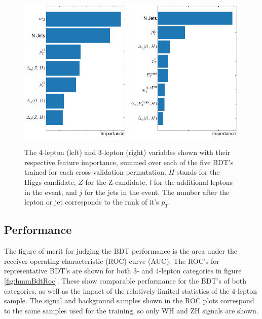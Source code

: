 \begin{figure}[htpb]
  \centering
  \includegraphics[height=7cm]{figures/hmm/bdtImportance/imp-4lep.pdf}
  \includegraphics[height=7cm]{figures/hmm/bdtImportance/imp-3lep.pdf}
  \caption{The 4-lepton (left) and 3-lepton (right) variables shown with their respective feature importance, summed over each of the five BDT's trained for each cross-validation permutation. $H$ stands for the Higgs candidate, $Z$ for the Z candidate, $l$ for the additional leptons in the event, and $j$ for the jets in the event. The number after the lepton or jet corresponds to the rank of it's $p_T$.}
    \label{fig:hmmVarImport}
\end{figure}

\clearpage

\subsection{Performance}
\label{sec:hmmBdtPerform}

The figure of merit for judging the BDT performance is the area under the receiver operating characteristic (ROC) curve (AUC). The ROC's for representative BDT's are shown for both 3- and 4-lepton categories in figure \ref{fig:hmmBdtRoc}. These show comparable performance for the BDT's of both categories, as well as the impact of the relatively limited statistics of the 4-lepton sample. The signal and background samples shown in the ROC plots correspond to the same samples used for the training, so only WH and ZH signals are shown.

